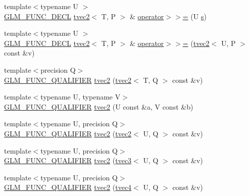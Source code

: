 \begin{DoxyCompactItemize}
\item 
{\footnotesize template$<$typename U $>$ }\\\hyperlink{setup_8hpp_ab2d052de21a70539923e9bcbf6e83a51}{G\+L\+M\+\_\+\+F\+U\+N\+C\+\_\+\+D\+E\+CL} \hyperlink{structglm_1_1detail_1_1tvec2}{tvec2}$<$ T, P $>$ \& \hyperlink{structglm_1_1detail_1_1tvec2_a7198fd5d5bacb28ad4e7709856126fa5}{operator$>$$>$=} (U \hyperlink{structglm_1_1detail_1_1tvec2_a6d602cf7c31b75396944d828ad2aea72}{s})
\item 
{\footnotesize template$<$typename U $>$ }\\\hyperlink{setup_8hpp_ab2d052de21a70539923e9bcbf6e83a51}{G\+L\+M\+\_\+\+F\+U\+N\+C\+\_\+\+D\+E\+CL} \hyperlink{structglm_1_1detail_1_1tvec2}{tvec2}$<$ T, P $>$ \& \hyperlink{structglm_1_1detail_1_1tvec2_aa5b4c36cf93fa89e33911f74c7352284}{operator$>$$>$=} (\hyperlink{structglm_1_1detail_1_1tvec2}{tvec2}$<$ U, P $>$ const \&v)
\item 
{\footnotesize template$<$precision Q$>$ }\\\hyperlink{setup_8hpp_a33fdea6f91c5f834105f7415e2a64407}{G\+L\+M\+\_\+\+F\+U\+N\+C\+\_\+\+Q\+U\+A\+L\+I\+F\+I\+ER} \hyperlink{structglm_1_1detail_1_1tvec2_a34375ce019c83789e03dc185c9025bee}{tvec2} (\hyperlink{structglm_1_1detail_1_1tvec2}{tvec2}$<$ T, Q $>$ const \&v)
\item 
{\footnotesize template$<$typename U, typename V$>$ }\\\hyperlink{setup_8hpp_a33fdea6f91c5f834105f7415e2a64407}{G\+L\+M\+\_\+\+F\+U\+N\+C\+\_\+\+Q\+U\+A\+L\+I\+F\+I\+ER} \hyperlink{structglm_1_1detail_1_1tvec2_a1057576a2eab171002a8ff2bf4bd68ad}{tvec2} (U const \&a, V const \&b)
\item 
{\footnotesize template$<$typename U, precision Q$>$ }\\\hyperlink{setup_8hpp_a33fdea6f91c5f834105f7415e2a64407}{G\+L\+M\+\_\+\+F\+U\+N\+C\+\_\+\+Q\+U\+A\+L\+I\+F\+I\+ER} \hyperlink{structglm_1_1detail_1_1tvec2_a8ea4daf34f1286102f8a0fc565b1376d}{tvec2} (\hyperlink{structglm_1_1detail_1_1tvec2}{tvec2}$<$ U, Q $>$ const \&v)
\item 
{\footnotesize template$<$typename U, precision Q$>$ }\\\hyperlink{setup_8hpp_a33fdea6f91c5f834105f7415e2a64407}{G\+L\+M\+\_\+\+F\+U\+N\+C\+\_\+\+Q\+U\+A\+L\+I\+F\+I\+ER} \hyperlink{structglm_1_1detail_1_1tvec2_a9dd6ae59acae6434a5ca48e06b01953d}{tvec2} (\hyperlink{structglm_1_1detail_1_1tvec3}{tvec3}$<$ U, Q $>$ const \&v)
\item 
{\footnotesize template$<$typename U, precision Q$>$ }\\\hyperlink{setup_8hpp_a33fdea6f91c5f834105f7415e2a64407}{G\+L\+M\+\_\+\+F\+U\+N\+C\+\_\+\+Q\+U\+A\+L\+I\+F\+I\+ER} \hyperlink{structglm_1_1detail_1_1tvec2_aca6e6031778d2739ec29acfdfc744dc1}{tvec2} (\hyperlink{structglm_1_1detail_1_1tvec4}{tvec4}$<$ U, Q $>$ const \&v)

\end{DoxyCompactItemize}
